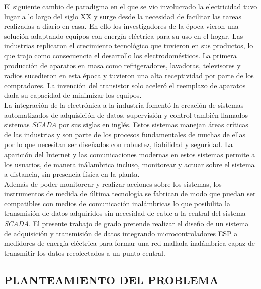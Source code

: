 \documentclass[12pt,letterpaper]{article}
\begin{document}
El siguiente cambio de paradigma en el que se vio involucrado la electricidad tuvo lugar a lo largo del siglo XX y surge desde la necesidad de facilitar las tareas realizadas a diario en casa. En ello los investigadores de la época vieron una solución adaptando equipos con energía eléctrica para su uso en el hogar. Las industrias replicaron el crecimiento tecnológico que tuvieron en sus productos, lo que trajo como consecuencia el desarrollo los electrodomésticos. La primera producción de aparatos en masa como refrigeradores, lavadoras, televisores y radios sucedieron en esta época y tuvieron una alta receptividad por parte de los compradores. La invención del transistor solo aceleró el reemplazo de aparatos dada su capacidad de minimizar los equipos.\\

La integración de la electrónica a la industria fomentó la creación de sistemas automatizados de adquisición de datos, supervisión y control también llamados sistemas \textit{SCADA} por sus siglas en inglés. Estos sistemas manejan áreas críticas de las industrias y son parte de los procesos fundamentales de muchas de ellas por lo que necesitan ser diseñados con robustez, fiabilidad y seguridad. La aparición del Internet y las comunicaciones modernas en estos sistemas permite a los usuarios, de manera inálambrica incluso, monitorear y actuar sobre el sistema a distancia, sin presencia física en la planta.\\

Además de poder monitorear y realizar acciones sobre los sistemas, los instrumentos de medida de última tecnología se fabrican de modo que puedan ser compatibles con medios de comunicación inalámbricas lo que posibilita la transmisión de datos adquiridos sin necesidad de cable a la central del sistema \textit{SCADA}. El presente trabajo de grado pretende realizar el diseño de un sistema de adquisición y transmisión de datos integrando microcontroladores ESP a medidores de energía eléctrica para formar una red mallada inalámbrica capaz de transmitir los datos recolectados a un punto central.

\newpage

		
\begin{center}
		\section*{ PLANTEAMIENTO DEL PROBLEMA}

\end{center}
\end{document}

